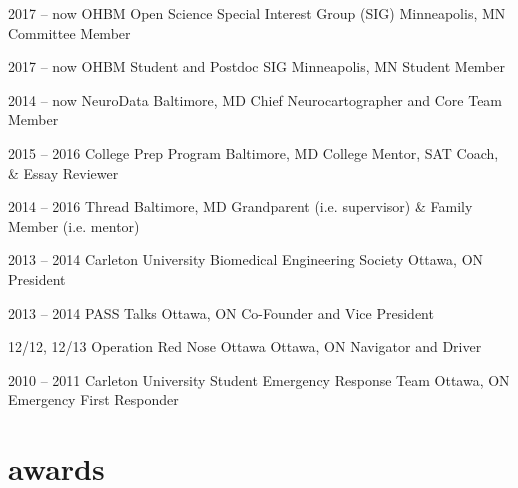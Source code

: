 \documentclass[]{friggeri-cv} %
\begin{document}
\begin{entrylist}
\entry
{2017 -- now}
{OHBM Open Science Special Interest Group (SIG)}
{Minneapolis, MN}
{Committee Member}

\entry
{2017 -- now}
{OHBM Student and Postdoc SIG}
{Minneapolis, MN}
{Student Member}

\entry
{2014 -- now}
{NeuroData}
{Baltimore, MD}
{Chief Neurocartographer and Core Team Member}
\end{entrylist}

\begin{entrylist}
\entry
{2015 -- 2016}
{College Prep Program}
{Baltimore, MD}
{College Mentor, SAT Coach, \& Essay Reviewer}

\entry
{2014 -- 2016}
{Thread}
{Baltimore, MD}
{Grandparent (i.e. supervisor) \& Family Member (i.e. mentor) }

\entry
{2013 -- 2014}
{Carleton University Biomedical Engineering Society}
{Ottawa, ON}
{President}

\entry
{2013 -- 2014}
{PASS Talks}
{Ottawa, ON}
{Co-Founder and Vice President}

\entry
{12/12, 12/13}
{Operation Red Nose Ottawa}
{Ottawa, ON}
{Navigator and Driver}

\entry
{2010 -- 2011}
{Carleton University Student Emergency Response Team}
{Ottawa, ON}
{Emergency First Responder}
\end{entrylist}


\section{awards}
\end{document}
